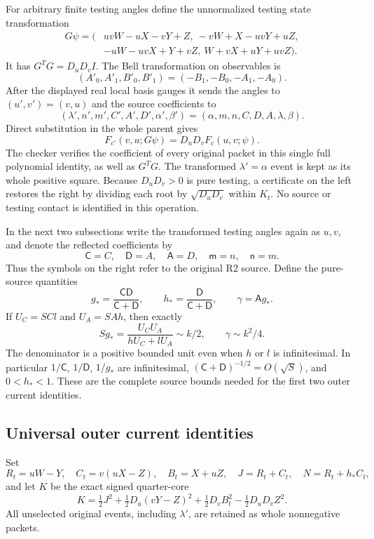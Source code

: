 For arbitrary finite testing angles define the unnormalized testing
state transformation
\[
\begin{split}
G\psi=(&uvW-uX-vY+Z,\ -vW+X-uvY+uZ,\\
       &-uW-uvX+Y+vZ,\ W+vX+uY+uvZ).
\end{split}
\tag{R2O4}
\]
It has $G^TG=D_uD_v I$.  The Bell transformation on observables is
\[
(A'_0,A'_1,B'_0,B'_1)=(-B_1,-B_0,-A_1,-A_0).
\]
After the displayed real local basis gauges it sends the angles to
$(u',v')=(v,u)$ and the source coefficients to
\[
(\lambda',n',m',C',A',D',\alpha',\beta')
 =(\alpha,m,n,C,D,A,\lambda,\beta).
\tag{R2O5}
\]
Direct substitution in the whole parent gives
\[
F_{c'}(v,u;G\psi)=D_uD_v F_c(u,v;\psi).
\tag{R2O6}
\]
The checker verifies the coefficient of every original packet in this
single full polynomial identity, as well as $G^TG$.  The transformed
$\lambda'=\alpha$ event is kept as its whole positive square.
Because $D_uD_v>0$ is pure testing, a certificate on the left restores
the right by dividing each root by $\sqrt{D_uD_v}$ within $K_t$.
No source or testing contact is identified in this operation.

In the next two subsections write the transformed testing angles again
as $u,v$, and denote the reflected coefficients by
\[
\mathsf C=C,\quad\mathsf D=A,\quad\mathsf A=D,
\quad\mathsf m=n,\quad\mathsf n=m.
\]
Thus the symbols on the right refer to the original R2 source.
Define the pure-source quantities
\[
g_* =\frac{\mathsf C\mathsf D}{\mathsf C+\mathsf D},\qquad
h_* =\frac{\mathsf D}{\mathsf C+\mathsf D},\qquad
\gamma=\mathsf A g_*.
\tag{R2O7}
\]
If $U_C=SC l$ and $U_A=SAh$, then exactly
\[
Sg_* =\frac{U_CU_A}{hU_C+lU_A}\sim k/2,
\qquad \gamma\sim k^2/4.
\tag{R2O8}
\]
The denominator is a positive bounded unit even when $h$ or $l$ is
infinitesimal.  In particular $1/\mathsf C$, $1/\mathsf D$,
$1/g_*$ are infinitesimal,
$(\mathsf C+\mathsf D)^{-1/2}=O(\sqrt S)$, and $0<h_*<1$.
These are the complete source bounds needed for the first two outer
current identities.

\subsection{Universal outer current identities}

Set
\[
R_t=uW-Y,\quad C_t=v(uX-Z),\quad B_t=X+uZ,\quad
J=R_t+C_t,\quad N=R_t+h_*C_t,
\]
and let $K$ be the exact signed quarter-core
\[
K=\tfrac12J^2+\tfrac12D_u(vY-Z)^2
 +\tfrac12D_vB_t^2-\tfrac12D_uD_vZ^2.
\tag{R2O9}
\]
All unselected original events, including $\lambda'$, are retained
as whole nonnegative packets.

